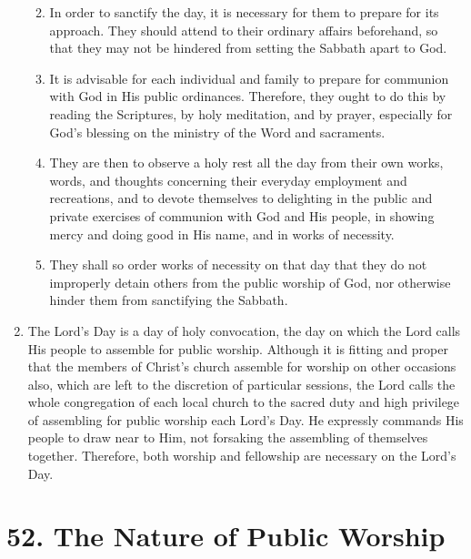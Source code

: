 \documentclass[
]{book}
\providecommand{\tightlist}{%
  \setlength{\itemsep}{0pt}\setlength{\parskip}{0pt}}
\begin{document}
\begin{enumerate}
  \begin{enumerate}
  \def\labelenumii{\alph{enumii}.}
  \tightlist
  \item
    In order to sanctify the day, it is necessary for them to prepare for its approach. They should attend to their ordinary affairs beforehand, so that they may not be hindered from setting the Sabbath apart to God.
  \item
    It is advisable for each individual and family to prepare for communion with God in His public ordinances. Therefore, they ought to do this by reading the Scriptures, by holy meditation, and by prayer, especially for God's blessing on the ministry of the Word and sacraments.
  \item
    They are then to observe a holy rest all the day from their own works, words, and thoughts concerning their everyday employment and recreations, and to devote themselves to delighting in the public and private exercises of communion with God and His people, in showing mercy and doing good in His name, and in works of necessity.
  \item
    They shall so order works of necessity on that day that they do not improperly detain others from the public worship of God, nor otherwise hinder them from sanctifying the Sabbath.
  \end{enumerate}
\item
  The Lord's Day is a day of holy convocation, the day on which the Lord calls His people to assemble for public worship. Although it is fitting and proper that the members of Christ's church assemble for worship on other occasions also, which are left to the discretion of particular sessions, the Lord calls the whole congregation of each local church to the sacred duty and high privilege of assembling for public worship each Lord's Day. He expressly commands His people to draw near to Him, not forsaking the assembling of themselves together. Therefore, both worship and fellowship are necessary on the Lord's Day.
\end{enumerate}

\hypertarget{the-nature-of-public-worship}{%
\section*{52. The Nature of Public Worship}\label{the-nature-of-public-worship}}

\protect\hypertarget{chapter-slug-52-the-nature-of-public-worship}{\href{}{}}
\end{document}
